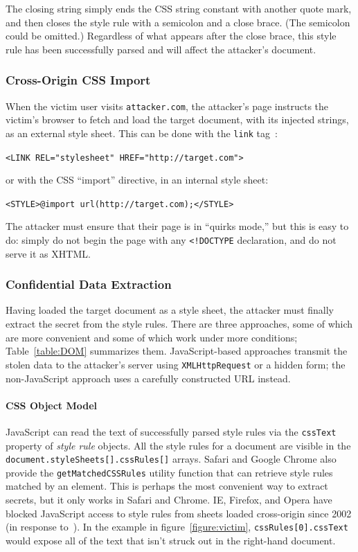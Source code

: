 \documentclass{acm_proc_article-sp}
\begin{document}
The closing string simply ends the CSS string constant with another
quote mark, and then closes the style rule with a semicolon and a
close brace.  (The semicolon could be omitted.)  Regardless of what
appears after the close brace, this style rule has been successfully
parsed and will affect the attacker's document.

\subsubsection{Cross-Origin CSS Import}
When the victim user visits \texttt{attacker.com}, the attacker's page
instructs the victim's browser to fetch and load the target document,
with its injected strings, as an external style sheet.  This can be
done with the \texttt{link} tag~\cite{html}:

\verb|<LINK REL="stylesheet" HREF="http://target.com">|

or with the CSS “import” directive, in an internal style sheet:

\verb|<STYLE>@import url(http://target.com);</STYLE>|

The attacker must ensure that their page is in “quirks mode,” but this
is easy to do: simply do not begin the page with any \verb|<!DOCTYPE|
declaration, and do not serve it as XHTML.

\subsubsection{Confidential Data Extraction}\label{sec:extraction}
Having loaded the target document as a style sheet, the attacker must
finally extract the secret from the style rules.  There are three
approaches, some of which are more convenient and some of which work
under more conditions; Table~\ref{table:DOM} summarizes them.
JavaScript-based approaches transmit the stolen data to the attacker's
server using \texttt{XMLHttpRequest} or a hidden form; the
non-JavaScript approach uses a carefully constructed URL instead.

\paragraph{CSS Object Model}
JavaScript can read the text of successfully parsed style rules via
the \texttt{cssText} property of \emph{style rule} objects.  All the
style rules for a document are visible in the
\texttt{document.styleSheets[].cssRules[]} arrays.  Safari and Google
Chrome also provide the \texttt{getMatchedCSSRules} utility function
that can retrieve style rules matched by an element.  This is perhaps
the most convenient way to extract secrets, but it only works in
Safari and Chrome.  IE, Firefox, and Opera have blocked JavaScript
access to style rules from sheets loaded cross-origin since 2002 (in
response to~\cite{cssxss02}).  In the example in
figure~\ref{figure:victim}, \texttt{cssRules[0].cssText} would expose
all of the text that isn't struck out in the right-hand document.
\end{document}
